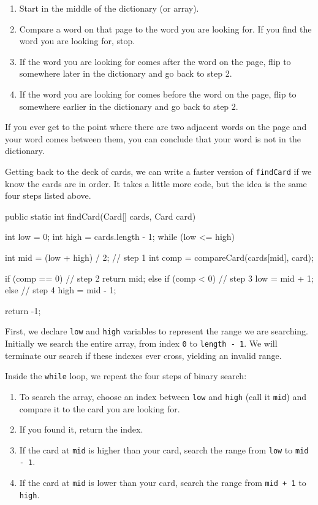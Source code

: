 \documentclass[12pt]{book}
\theoremstyle{exercise}
\newcommand{\java}[1]{\verb"#1"}
\newcommand{\java}[1]{\lstinline{#1}} %
\begin{document}
\begin{enumerate}
\item Start in the middle of the dictionary (or array).
\item Compare a word on that page to the word you are looking for.
If you find the word you are looking for, stop.
\item If the word you are looking for comes after the word on the page, flip to somewhere later in the dictionary and go back to step 2.
\item If the word you are looking for comes before the word on the page, flip to somewhere earlier in the dictionary and go back to step 2.
\end{enumerate}

If you ever get to the point where there are two adjacent words on the page and your word comes between them, you can conclude that your word is not in the dictionary.

Getting back to the deck of cards, we can write a faster version of \java{findCard} if we know the cards are in order.
It takes a little more code, but the idea is the same four steps listed above.

\begin{code}
public static int findCard(Card[] cards, Card card) {
    int low = 0;
    int high = cards.length - 1;
    while (low <= high) {
        int mid = (low + high) / 2;                   // step 1
        int comp = compareCard(cards[mid], card);

        if (comp == 0) {                              // step 2
            return mid;
        } else if (comp < 0) {                        // step 3
            low = mid + 1;
        } else {                                      // step 4
            high = mid - 1;
        }
    }
    return -1;
}
\end{code}

First, we declare \java{low} and \java{high} variables to represent the range we are searching.
Initially we search the entire array, from index \java{0} to \java{length - 1}.
We will terminate our search if these indexes ever cross, yielding an invalid range.

Inside the \java{while} loop, we repeat the four steps of binary search:

\begin{enumerate}

\item To search the array, choose an index between \java{low} and \java{high} (call it \java{mid}) and compare it to the card you are looking for.

\item If you found it, return the index.

\item If the card at \java{mid} is higher than your card, search the range from \java{low} to \java{mid - 1}.

\item If the card at \java{mid} is lower than your card, search the range from \java{mid + 1} to \java{high}.

\end{enumerate}
\end{document}
